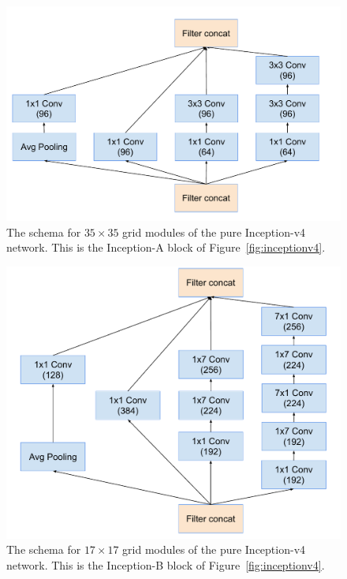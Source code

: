 \begin{figure}
\centering
\includegraphics[width=\linewidth]{wide35x35module}
\caption{The schema for $35\times 35$ grid modules of the pure Inception-v4
 network. This is the Inception-A block of Figure~\ref{fig:inceptionv4}. }
\label{fig:wide35x35module}
\end{figure}
\begin{figure}
\centering
\includegraphics[width=\linewidth]{wide17x17module}
\caption{The schema for $17\times 17$ grid modules of the pure Inception-v4
 network. This is the Inception-B block of Figure~\ref{fig:inceptionv4}.}
\label{fig:wide17x17module}
\end{figure}
